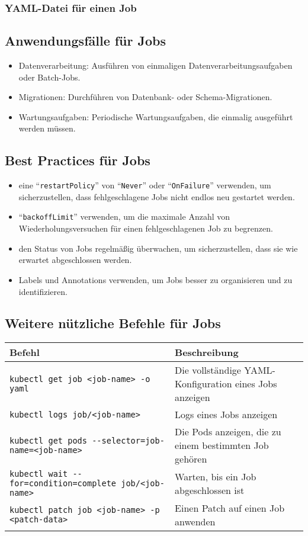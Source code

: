 \subsubsection{YAML-Datei für einen Job}


\subsection{Anwendungsfälle für Jobs}
\begin{itemize}
    \item Datenverarbeitung: Ausführen von einmaligen Datenverarbeitungsaufgaben oder Batch-Jobs.
    \item Migrationen: Durchführen von Datenbank- oder Schema-Migrationen.
    \item Wartungsaufgaben: Periodische Wartungsaufgaben, die einmalig ausgeführt werden müssen.
\end{itemize}

\subsection{Best Practices für Jobs}
\begin{itemize}
    \item eine \enquote{\texttt{restartPolicy}} von \enquote{\texttt{Never}} oder \enquote{\texttt{OnFailure}} verwenden, um sicherzustellen, dass fehlgeschlagene Jobs nicht endlos neu gestartet werden.
    \item \enquote{\texttt{backoffLimit}} verwenden, um die maximale Anzahl von Wiederholungsversuchen für einen fehlgeschlagenen Job zu begrenzen.
    \item den Status von Jobs regelmäßig überwachen, um sicherzustellen, dass sie wie erwartet abgeschlossen werden.
    \item Labels und Annotations verwenden, um Jobs besser zu organisieren und zu identifizieren.
\end{itemize}

\subsection{Weitere nützliche Befehle für Jobs}
\begin{tabular}{|p{}|p{}|}
\hline
\textbf{Befehl} & \textbf{Beschreibung} \\
\hline
\texttt{kubectl get job <job-name> -o yaml} & Die vollständige YAML-Konfiguration eines Jobs anzeigen \\
\texttt{kubectl logs job/<job-name>} & Logs eines Jobs anzeigen \\
\texttt{kubectl get pods {-}{-}selector=job-name=<job-name>} & Die Pods anzeigen, die zu einem bestimmten Job gehören \\
\texttt{kubectl wait {-}{-}for=condition=complete job/<job-name>} & Warten, bis ein Job abgeschlossen ist \\
\texttt{kubectl patch job <job-name> -p <patch-data>} & Einen Patch auf einen Job anwenden \\
\hline
\end{tabular}

